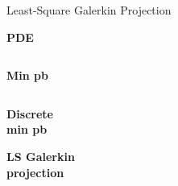 \begin{frame}{Least-Square Galerkin Projection}
\begin{center}
\begin{tcolorbox}
			\vspace{5pt}
			
			\begin{minipage}{0.1\linewidth}
				\centering
				\textbf{PDE}
			\end{minipage} $\; \quad \;$ \begin{minipage}{0.1\linewidth}
				\centering
				\textbf{Min pb}
			\end{minipage} $\; \quad \;$ \begin{minipage}{0.1\linewidth}
				\centering
				\textbf{Discrete} \\
				\textbf{min pb}
			\end{minipage} \; \hspace{60pt} \; \begin{minipage}{0.15\linewidth}
				\centering
				\textbf{LS Galerkin} \\
				\textbf{projection}
			\end{minipage}
		\end{tcolorbox}
	\end{center}
\end{frame}

